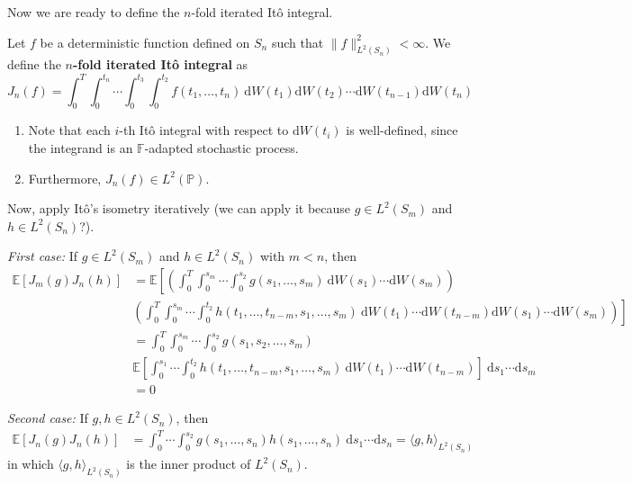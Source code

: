 Now we are ready to define the \(n\)-fold iterated Itô integral.

\begin{definition}
    Let \(f\) be a deterministic function defined on
    \(S_n\) such that \(\| f \|_{L^2(S_n)}^2 < \infty\). We define the
    \textbf{\(n\)-fold iterated Itô integral} as \[
    J_n(f) = \int_0^T \int_0^{t_n} \cdots \int_0^{t_3} \int_0^{t_2} f(t_1, \ldots, t_n) ~\mathrm{d}W(t_1) \mathrm{d}W(t_2) \cdots \mathrm{d}W(t_{n-1}) \mathrm{d}W(t_n)
    \]
\end{definition}

\begin{remark}
    \begin{enumerate}
        \def\labelenumi{\arabic{enumi}.}
        \item
          Note that each \(i\)-th Itô integral with respect to
          \(\mathrm{d}W(t_i)\) is well-defined, since the integrand is an
          \(\mathbb{F}\)-adapted stochastic process.
        \item
          Furthermore, \(J_n(f) \in L^2(\mathbb{P})\).
    \end{enumerate}
\end{remark}

Now, apply Itô's isometry iteratively (we can apply it because \(g \in L^2(S_m)\) and \(h \in L^2(S_n)\)?).

\emph{First case:} If \(g \in L^2(S_m)\) and \(h \in L^2(S_n)\) with
\(m < n\), then \[
\begin{aligned}
    \mathbb{E}[J_m(g) J_n(h)] &= \mathbb{E} \left[ \left( \int_0^T \int_0^{s_m} \cdots \int_0^{s_2} g(s_1, \ldots, s_m) ~\mathrm{d}W(s_1) \cdots \mathrm{d}W(s_m) \right) \right. \\
    & \left. \left( \int_0^T \int_0^{s_m} \cdots \int_0^{t_2} h(t_1, \ldots, t_{n-m}, s_1, \ldots, s_m) ~\mathrm{d}W(t_1) \cdots \mathrm{d}W(t_{n-m}) \mathrm{d}W(s_1) \cdots \mathrm{d}W(s_m) \right) \right] \\
    &= \int_0^T \int_0^{s_m} \cdots \int_0^{s_2} g(s_1, s_2, \ldots, s_m)  \\
    &\mathbb{E} \left[ \int_0^{s_1} \cdots \int_0^{t_2} h(t_1, \ldots, t_{n-m}, s_1, \ldots, s_m) ~\mathrm{d}W(t_1) \cdots \mathrm{d}W(t_{n-m}) \right] ~\mathrm{d}s_1 \cdots \mathrm{d}s_m \\
    &= 0
\end{aligned}
\]

\emph{Second case:} If \(g, h \in L^2(S_n)\), then \[
\begin{aligned}
    \mathbb{E}[J_n(g) J_n(h)] &= \int_0^T \cdots \int_0^{s_2} g(s_1, \ldots, s_n) h(s_1, \ldots, s_n) ~\mathrm{d}s_1 \cdots \mathrm{d}s_n = \langle g, h \rangle_{L^2(S_n)}
\end{aligned}
\] in which \(\langle g, h \rangle_{L^2(S_n)}\) is the inner product of
\(L^2(S_n)\).

